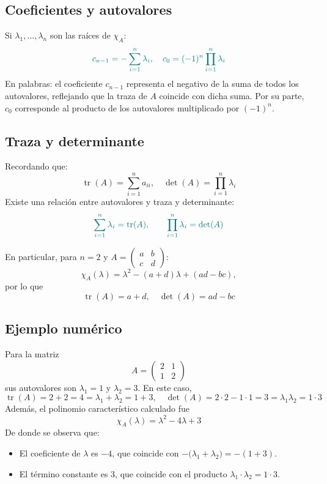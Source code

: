 \documentclass{article}
\begin{document}
\subsection*{Coeficientes y autovalores}
Si \(\lambda_1,\dots,\lambda_n\) son las raíces de \(\chi_A\):
\[\color{teal}
c_{n-1} = -\sum_{i=1}^n \lambda_i,
\quad
c_0 = (-1)^n\prod_{i=1}^n \lambda_i
\]
En palabras: el coeficiente \(c_{n-1}\) representa el negativo de la suma de todos los autovalores, reflejando que la traza de \(A\) coincide con dicha suma. Por su parte, \(c_0\) corresponde al producto de los autovalores multiplicado por \((-1)^n\).

\subsection*{Traza y determinante}
Recordando que:
\[
\operatorname{tr}(A) = \sum_{i=1}^n a_{ii},
\quad
\det(A) = \prod_{i=1}^n \lambda_i
\]
Existe una relación entre autovalores y traza y determinante:
\[\color{teal}
\sum_{i=1}^n \lambda_i = \operatorname{tr}(A),
\qquad
\prod_{i=1}^n \lambda_i = \det(A)
\]

En particular, para \(n=2\) y \(A=\begin{pmatrix}a&b\\c&d\end{pmatrix}\):
\[
\chi_A(\lambda)=\lambda^2 - (a+d)\lambda + (ad-bc),
\]
por lo que
\[
\operatorname{tr}(A)=a+d,
\quad
\det(A)=ad-bc
\]

\subsection*{Ejemplo numérico}
Para la matriz
\[
A = \begin{pmatrix}2 & 1\\1 & 2\end{pmatrix}
\]
sus autovalores son \(\lambda_1=1\) y \(\lambda_2=3\). En este caso,
\[
\operatorname{tr}(A)=2+2=4=\lambda_1+\lambda_2=1+3,
\quad
\det(A)=2\cdot2-1\cdot1=3=\lambda_1\lambda_2=1\cdot3
\]
Además, el polinomio característico calculado fue
\[
\chi_A(\lambda)=\lambda^2 - 4\lambda + 3
\]
De donde se observa que:
\begin{itemize}
  \item El coeficiente de \(\lambda\) es \(-4\), que coincide con \(-\bigl(\lambda_1 + \lambda_2\bigr)=-(1+3)\).
  \item El término constante es \(3\), que coincide con el producto \(\lambda_1 \cdot \lambda_2 = 1 \cdot 3\).
\end{itemize}
\end{document}
